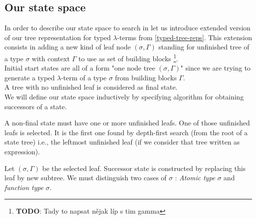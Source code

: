 \documentclass[12pt,a4paper]{report}
\newcommand{\lets}{let us\xspace}
\newcommand{\lterm}{$\lambda$-term\xspace}
\newcommand{\lterms}{$\lambda$-terms\xspace}
\begin{document}
\subsection{Our state space}




In order to describe our state space to search in \lets introduce
extended version of our tree representation for typed \lterms from \ref{typed-tree-reps}.
This extension consists in adding a new kind of leaf node $(\sigma,\Gamma)$ 
standing for unfinished tree of a type $\sigma$ with context $\Gamma$ to use
as set of building blocks
\footnote{\textbf{TODO}: Tady to napsat nějak líp s tim gamma }.\\

Initial start states are all of a form "one node tree $(\sigma,\Gamma)$" since we
are trying to generate a typed \lterm of a type $\sigma$ from building blocks $\Gamma$.\\

A tree with no unfinished leaf is considered as final state.  \\

We will define our state space inductively by specifying algorithm for obtaining 
successors of a state.

A non-final state must have one or more unfinished leafs. 
One of those unfinished leafs is selected. 
It is the first one found by depth-first search (from the root of a state tree)
i.e., the leftmost unfinished leaf (if we consider that tree written as expression).

Let $(\sigma,\Gamma)$ be the selected leaf. Successor state is constructed 
by replacing this leaf by new subtree. We must distinguish two cases of $\sigma$ :
\textit{Atomic type} $\sigma$ and \textit{function type} $\sigma$.\\
\end{document}
